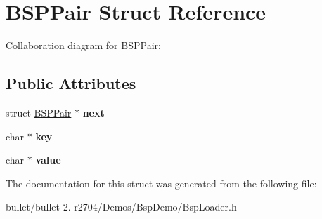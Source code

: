 \hypertarget{struct_b_s_p_pair}{\section{B\+S\+P\+Pair Struct Reference}
\label{struct_b_s_p_pair}
}


Collaboration diagram for B\+S\+P\+Pair\+:
\subsection*{Public Attributes}
\begin{DoxyCompactItemize}
\item 
\hypertarget{struct_b_s_p_pair_a742aacb5dc40e0983cab761229c0e169}{struct \hyperlink{struct_b_s_p_pair}{B\+S\+P\+Pair} $\ast$ {\bfseries next}}\label{struct_b_s_p_pair_a742aacb5dc40e0983cab761229c0e169}

\item 
\hypertarget{struct_b_s_p_pair_a1dc0028a2bec79f255dc5007309d1cd4}{char $\ast$ {\bfseries key}}\label{struct_b_s_p_pair_a1dc0028a2bec79f255dc5007309d1cd4}

\item 
\hypertarget{struct_b_s_p_pair_a1e7ef7a7be5f875fa1035ef8c58023d9}{char $\ast$ {\bfseries value}}\label{struct_b_s_p_pair_a1e7ef7a7be5f875fa1035ef8c58023d9}

\end{DoxyCompactItemize}


The documentation for this struct was generated from the following file\+:\begin{DoxyCompactItemize}
\item 
bullet/bullet-\/2.-\/r2704/\+Demos/\+Bsp\+Demo/Bsp\+Loader.\+h\end{DoxyCompactItemize}
